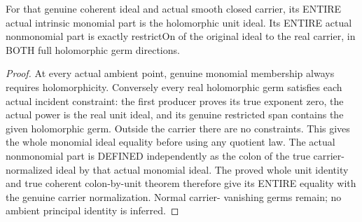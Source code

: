 \begin{theorem}
\label{hir:sharp-actual-no-member-factor-whole-monomial-unit-residual-normalization}
\leanok
For that genuine coherent ideal and actual smooth closed carrier, its
ENTIRE actual intrinsic monomial part is the holomorphic unit ideal. Its
ENTIRE actual nonmonomial part is exactly restrictOn of the original ideal
to the real carrier, in BOTH full holomorphic germ directions.
\end{theorem}
\begin{proof}
At every actual ambient point, genuine monomial membership always requires
holomorphicity. Conversely every real holomorphic germ satisfies each actual
incident constraint: the first producer proves its true exponent zero, the
actual power is the real unit ideal, and its genuine restricted span contains
the given holomorphic germ. Outside the carrier there are no constraints.
This gives the whole monomial ideal equality before using any quotient law.
The actual nonmonomial part is DEFINED independently as the colon of the
true carrier-normalized ideal by that actual monomial ideal. The proved
whole unit identity and true coherent colon-by-unit theorem therefore give
its ENTIRE equality with the genuine carrier normalization. Normal carrier-
vanishing germs remain; no ambient principal identity is inferred.
\end{proof}

